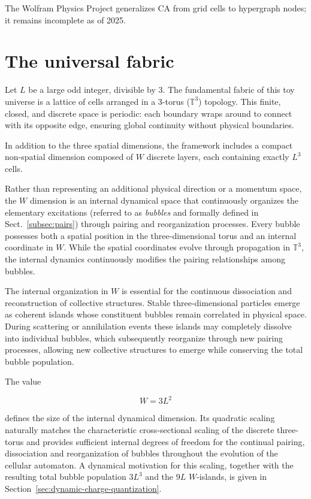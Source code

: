 \documentclass{ijuc}
\begin{document}
The Wolfram Physics Project generalizes CA from grid cells to hypergraph nodes; it remains incomplete as of 2025.

\section{The universal fabric \label{sec:space-and-time}}

Let \( L \) be a large odd integer, divisible by 3. The fundamental fabric of this toy universe is a lattice of cells arranged in a 
3-torus (\( \mathbb{T}^3 \)) topology. This finite, closed, and discrete space is periodic: each boundary wraps around to connect with its opposite edge, ensuring global continuity without physical boundaries.

In addition to the three spatial dimensions, the framework includes a compact non-spatial dimension composed of \(W\) discrete layers, 
each containing exactly \(L^3\) cells.

Rather than representing an additional physical direction or a momentum space, the \(W\) dimension is an internal dynamical space that
 continuously organizes the elementary excitations (referred to as \emph{bubbles} and formally defined in Sect.~\ref{subsec:pairs}) through pairing and reorganization processes. Every bubble possesses both a spatial 
 position in the three-dimensional torus and an internal coordinate in \(W\). While the spatial coordinates evolve through propagation 
 in \(\mathbb{T}^3\), the internal dynamics continuously modifies the pairing relationships among bubbles.

The internal organization in \(W\) is essential for the continuous dissociation and reconstruction of collective structures. Stable 
three-dimensional particles emerge as coherent islands whose constituent bubbles remain correlated in physical space. During scattering or annihilation events these islands may completely dissolve into individual bubbles, which 
subsequently reorganize through new pairing processes, allowing new collective structures to emerge while conserving the total bubble 
population.

The value

\[
W=3L^2
\]

defines the size of the internal dynamical dimension. Its quadratic scaling naturally matches the characteristic cross-sectional 
scaling of the discrete three-torus and provides sufficient internal degrees of freedom for the continual pairing, dissociation and 
reorganization of bubbles throughout the evolution of the cellular automaton. A dynamical motivation for this scaling, together with the resulting total bubble population $3L^3$ and the $9L$ $W$-islands, is given in Section~\ref{sec:dynamic-charge-quantization}.
\end{document}
